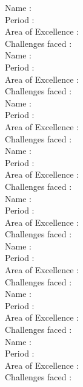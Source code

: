 \documentclass[a4paper,10pt]{article}
\begin{document}
\newblock
Name : \\
Period : \\
Area of Excellence : \\
Challenges faced : \\

\newblock
Name : \\
Period : \\
Area of Excellence : \\
Challenges faced : \\

\newblock
Name : \\
Period : \\
Area of Excellence : \\
Challenges faced : \\

\newblock
Name : \\
Period : \\
Area of Excellence : \\
Challenges faced : \\

\newblock
Name : \\
Period : \\
Area of Excellence : \\
Challenges faced : \\

\newblock
Name : \\
Period : \\
Area of Excellence : \\
Challenges faced : \\

\newblock
Name : \\
Period : \\
Area of Excellence : \\
Challenges faced : \\

\newblock
Name : \\
Period : \\
Area of Excellence : \\
Challenges faced : \\
\end{document}
